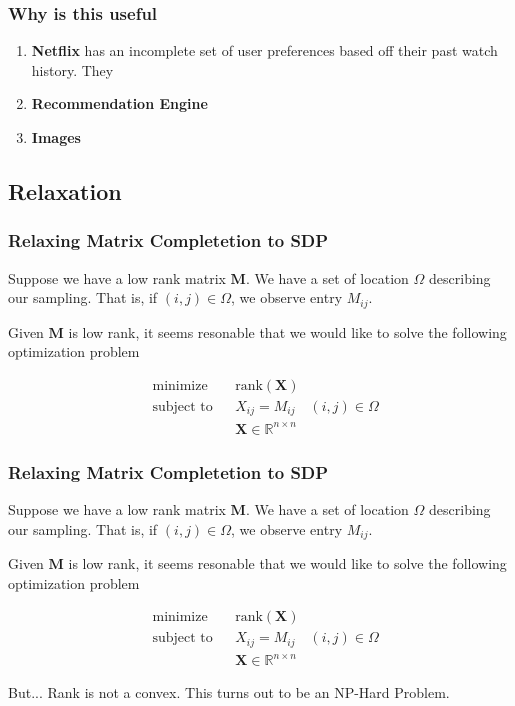 \documentclass[
	11pt, %
]{beamer}
\begin{document}
\begin{frame}
	\frametitle{Why is this useful}
	\begin{enumerate}
		\item \textbf{Netflix} has an incomplete set of user preferences based off their past watch history. They 
		\item \textbf{Recommendation Engine}
		\item \textbf{Images}
	\end{enumerate}
\end{frame}


\subsection{Relaxation} 

\begin{frame}
	\frametitle{Relaxing Matrix Completetion to SDP}
	Suppose we have a low rank matrix $\mathbf{M}$. We have a set of location $\Omega$ describing
	our sampling. That is, if $(i,j) \in \Omega$, we observe entry $M_{ij}$. 
	
	Given $\mathbf{M}$ is low rank, 
	it seems resonable that we would like to solve the following optimization problem
	
	\begin{equation*}
	  \begin{aligned}
	  & {\text{minimize}}
	  & & \text{rank}(\mathbf{X}) \\[1pt]
	  & \text{subject to}
	  & & X_{ij} = M_{ij} \quad (i,j) \in \Omega\\[1pt]
	  &&& \mathbf{X} \in \mathbb{R}^{n \times n}
	  \end{aligned}
	\end{equation*}

\end{frame}

\begin{frame}
	\frametitle{Relaxing Matrix Completetion to SDP}
	Suppose we have a low rank matrix $\mathbf{M}$. We have a set of location $\Omega$ describing
	our sampling. That is, if $(i,j) \in \Omega$, we observe entry $M_{ij}$. 
	
	Given $\mathbf{M}$ is low rank, 
	it seems resonable that we would like to solve the following optimization problem
	
	\begin{equation*}
	  \begin{aligned}
	  & {\text{minimize}}
	  & & \text{rank}(\mathbf{X}) \\[1pt]
	  & \text{subject to}
	  & & X_{ij} = M_{ij} \quad (i,j) \in \Omega\\[1pt]
	  &&& \mathbf{X} \in \mathbb{R}^{n \times n}
	  \end{aligned}
	\end{equation*}

	\begin{alertblock}{But...}
		Rank is not a convex. This turns out to be an NP-Hard Problem.
	\end{alertblock}
\end{frame}
\end{document}

